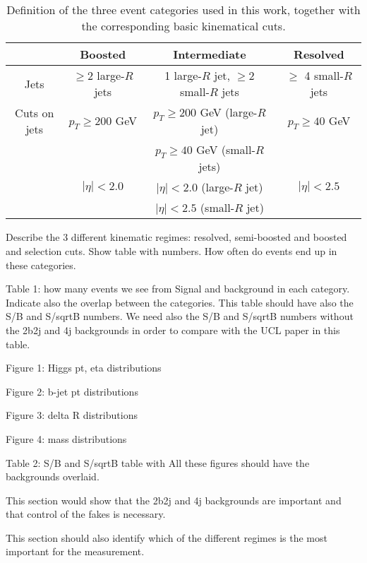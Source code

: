\begin{table}[h]
  \centering
  \small
  \begin{tabular}{c|c|c|c}
    \hline
    &  Boosted  &  Intermediate  &  Resolved  \\
    \hline
    \hline 
    Jets  &  $\ge 2$ large-$R$ jets  & 1 large-$R$ jet, $\ge 2$ small-$R$
    jets  &  $\ge$ 4 small-$R$ jets \\
    Cuts on jets  & $p_T \ge 200$ GeV   &  $p_T \ge 200$ GeV (large-$R$ jet)
    &  $p_T \ge 40$ GeV \\
    &  & $p_T \ge 40$ GeV (small-$R$ jets)   &    \\
    &   $|\eta|<2.0$  & $|\eta|<2.0$ (large-$R$ jet) & $|\eta|<2.5$ \\
    &        & $|\eta|<2.5$ (small-$R$ jet)  &  \\
    \hline
    \end{tabular}
  \caption{\small Definition of the three event categories used in this
    work, together with the corresponding basic kinematical cuts.
\label{sec:categorisation}
  }
\end{table}

Describe the 3 different kinematic regimes: resolved, semi-boosted and boosted and selection cuts. Show table with numbers. How often do events end up in these categories.

Table 1: how many events we see from Signal and background in each category. Indicate also the overlap between the categories. This table should have also the S/B and S/sqrtB numbers. We need also the S/B and S/sqrtB numbers without the 2b2j and 4j backgrounds in order to compare with the UCL paper in this table.

Figure 1: Higgs pt, eta distributions

Figure 2: b-jet pt distributions

Figure 3: delta R distributions

Figure 4: mass distributions

Table 2: S/B and S/sqrtB table with
All these figures should have the backgrounds overlaid.

This section would show that the 2b2j and 4j backgrounds are important and that control of the fakes is necessary.

This section should also identify which of the different regimes is the most important for the measurement.

